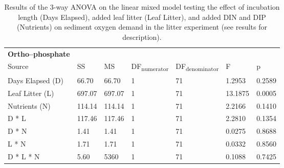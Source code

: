 \begin{table}
\begin{tabular}{ l l l l l l l }
\textbf{Ortho--phosphate} & & & & & &\\
Source           & SS      & MS     & DF\textsubscript{numerator} & DF\textsubscript{denominator} & F       & p  \\
Days Elapsed (D) & 66.70   & 66.70  & 1                           & 71                            & 1.2953  & 0.2589 \\
Leaf Litter (L)  & 697.07  & 697.07 & 1                           & 71                            & 13.1875 & 0.0005 \\
Nutrients (N)    & 114.14  & 114.14 & 1                           & 71                            & 2.2166  & 0.1410 \\
D * L            & 117.46  & 117.46 & 1                           & 71                            & 2.2810  & 0.1354 \\
D * N            & 1.41    & 1.41   & 1                           & 71                            & 0.0275  & 0.8688 \\
L * N            & 1.71    & 1.71   & 1                           & 71                            & 0.0332  & 0.8560 \\
D * L * N        & 5.60    & 5360   & 1                           & 71                            & 0.1088  & 0.7425 \\

\end{tabular}
\caption{Results of the 3-way ANOVA on the linear mixed model testing the effect of incubation length (Days Elapsed), added leaf litter (Leaf Litter), and added DIN and DIP (Nutrients) on sediment oxygen demand in the litter experiment (see results for description).}
\end{table}